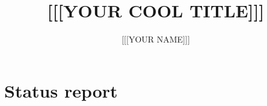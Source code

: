 \documentclass[10pt]{beamer} %
\title[]{[[[YOUR COOL TITLE]]]}
\author[]{[[[YOUR NAME]]]}
\institute[*]{\email{you@yourmail.com}}
\date{} %
\begin{document}
	
	\begin{nosidebarframe}\titlepage\end{nosidebarframe}

    \listOfTodosFrame %



	
	
	\section{Status report} 

		\completedTable  %

		\inDevTable %

	
	
\end{document}

